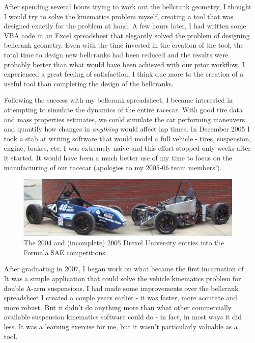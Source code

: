 After spending several hours trying to work out the bellcrank geometry, I thought I would try to solve the kinematics problem myself, creating a tool that was designed exactly for the problem at hand.  A few hours later, I had written some VBA code in an Excel spreadsheet that elegantly solved the problem of designing bellcrank geometry.  Even with the time invested in the creation of the tool, the total time to design new bellcranks had been reduced and the results were probably better than what would have been achieved with our prior workflow.  I experienced a great feeling of satisfaction, I think due more to the creation of a useful tool than completing the design of the bellcranks.

Following the success with my bellcrank spreadsheet, I became interested in attempting to simulate the dynamics of the entire racecar.  With good tire data and mass properties estimates, we could simulate the car performing maneuvers and quantify how changes in \emph{anything} would affect lap times.  In December 2005 I took a stab at writing software that would model a full vehicle - tires, suspension, engine, brakes, etc.  I was extremely naive and this effort stopped only weeks after it started.  It would have been a much better use of my time to focus on the manufacturing of our racecar (apologies to my 2005-06 team members!).

\begin{figure}
  \includegraphics[width=\textwidth]{images/04-05cars}
  \caption{The 2004 and (incomplete) 2005 Drexel University entries into the Formula SAE competitions}
  \centering
\end{figure}

After graduating in 2007, I began work on what became the first incarnation of \vvase{}.  It was a simple application that could solve the vehicle kinematics problem for double A-arm suspensions.  I had made some improvements over the bellcrank spreadsheet I created a couple years earlier - it was faster, more accurate and more robust.  But it didn't do anything more than what other commercially available suspension kinematics software could do - in fact, in most ways it did less.  It was a learning exercise for me, but it wasn't particularly valuable as a tool.

